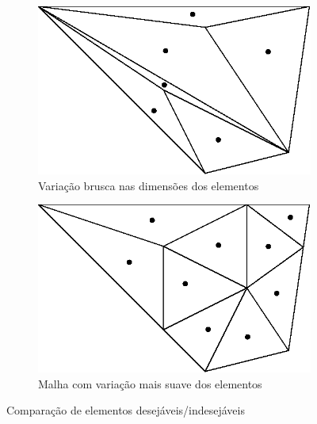\begin{figure}[ht]
    \begin{subfigure}{.5\textwidth}
        \centering
        \includegraphics[width=.8\linewidth]{fig/variacao_brusca.eps}
        \caption{Variação brusca nas dimensões dos elementos}
        \label{fig:sub-brusca}
    \end{subfigure}
    \begin{subfigure}{.5\textwidth}
        \centering
        \includegraphics[width=.8\linewidth]{fig/variacao_suave.eps}
        \caption{Malha com variação mais suave dos elementos}
        \label{fig:sub-suave}
    \end{subfigure}
    \caption{Comparação de elementos desejáveis/indesejáveis}
    \label{fig:figlegal}
\end{figure}
